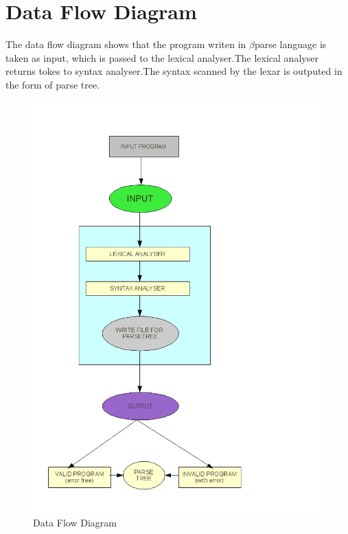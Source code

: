 \documentclass[12pt, oneside, a4paper]{article}
\begin{document}
\section{Data Flow Diagram}
The data flow diagram shows that the program writen in $\beta$parse language is taken as input, which is passed to the lexical analyser.The lexical analyser returns tokes to syntax analyser.The syntax scanned by the lexar is outputed in the form of parse tree.
\begin{figure}[htb]
\begin{center}
\ifpdf
	\includegraphics[scale=0.40]{DFD.png}
\else
\fi
\caption{Data Flow Diagram}
\end{center}
\end{figure}
\newpage
\end{document}
